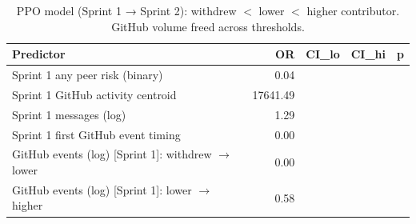 \begin{table}[ht]
\centering
\begin{tabular}{lrrrr}
  \toprule
Predictor & OR & CI_lo & CI_hi & p \\ 
  \midrule
Sprint 1 any peer risk (binary) & 0.04 &  &  &  \\ 
  Sprint 1 GitHub activity centroid & 17641.49 &  &  &  \\ 
  Sprint 1 messages (log) & 1.29 &  &  &  \\ 
  Sprint 1 first GitHub event timing & 0.00 &  &  &  \\ 
  GitHub events (log) [Sprint 1]: withdrew $\to$ lower & 0.00 &  &  &  \\ 
  GitHub events (log) [Sprint 1]: lower $\to$ higher & 0.58 &  &  &  \\ 
   \bottomrule
\end{tabular}
\caption{PPO model (Sprint 1 → Sprint 2): withdrew $<$ lower $<$ higher contributor. GitHub volume freed across thresholds.} 
\label{tab:ordered_s1s2}
\end{table}
